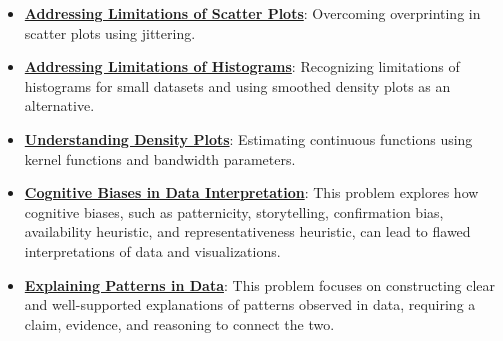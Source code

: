 \documentclass{article}%
\begin{document}
\begin{itemize}[leftmargin=*]
\item \href{https://purdue.brightspace.com/d2l/common/assets/pdfjs-d2l-dist/1.0.14-legacy/web/viewer.html?file=\%2Fcontent\%2Fenforced\%2F1095465-WL.202510.CS24200.LE1\%2F10L2-Vis.pdf\%3Fou\%3D1095465\&lang=en-us\&container=d2l-fileviewer-rendered-pdf\&fullscreen=d2l-fileviewer-rendered-pdf-dialog\&height=667#page=21}{\textbf{Addressing Limitations of Scatter Plots}}: Overcoming overprinting in scatter plots using jittering.%
\item \href{https://purdue.brightspace.com/d2l/common/assets/pdfjs-d2l-dist/1.0.14-legacy/web/viewer.html?file=\%2Fcontent\%2Fenforced\%2F1095465-WL.202510.CS24200.LE1\%2F10L2-Vis.pdf\%3Fou\%3D1095465\&lang=en-us\&container=d2l-fileviewer-rendered-pdf\&fullscreen=d2l-fileviewer-rendered-pdf-dialog\&height=667#page=31}{\textbf{Addressing Limitations of Histograms}}: Recognizing limitations of histograms for small datasets and using smoothed density plots as an alternative.%
\item \href{https://purdue.brightspace.com/d2l/common/assets/pdfjs-d2l-dist/1.0.14-legacy/web/viewer.html?file=\%2Fcontent\%2Fenforced\%2F1095465-WL.202510.CS24200.LE1\%2F10L2-Vis.pdf\%3Fou\%3D1095465\&lang=en-us\&container=d2l-fileviewer-rendered-pdf\&fullscreen=d2l-fileviewer-rendered-pdf-dialog\&height=667#page=32}{\textbf{Understanding Density Plots}}: Estimating continuous functions using kernel functions and bandwidth parameters.%
\item \href{https://purdue.brightspace.com/d2l/common/assets/pdfjs-d2l-dist/1.0.14-legacy/web/viewer.html?file=\%2Fcontent\%2Fenforced\%2F1095465-WL.202510.CS24200.LE1\%2F12-truth.pdf\%3Fou\%3D1095465\&lang=en-us\&container=d2l-fileviewer-rendered-pdf\&fullscreen=d2l-fileviewer-rendered-pdf-dialog\&height=667#page=13}{\textbf{Cognitive Biases in Data Interpretation}}: This problem explores how cognitive biases, such as patternicity, storytelling, confirmation bias, availability heuristic, and representativeness heuristic, can lead to flawed interpretations of data and visualizations.%
\item \href{https://purdue.brightspace.com/d2l/common/assets/pdfjs-d2l-dist/1.0.14-legacy/web/viewer.html?file=\%2Fcontent\%2Fenforced\%2F1095465-WL.202510.CS24200.LE1\%2F13L2-hypothesis.pdf\%3Fou\%3D1095465\&lang=en-us\&container=d2l-fileviewer-rendered-pdf\&fullscreen=d2l-fileviewer-rendered-pdf-dialog\&height=667#page=3}{\textbf{Explaining Patterns in Data}}: This problem focuses on constructing clear and well-supported explanations of patterns observed in data, requiring a claim, evidence, and reasoning to connect the two.%
\end{itemize}
\end{document}
